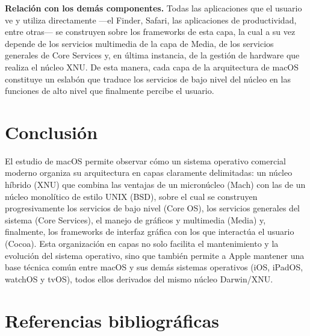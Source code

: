 \documentclass[12pt,letterpaper]{article}
\begin{document}
\textbf{Relación con los demás componentes.} Todas las aplicaciones que el usuario ve y utiliza directamente —el Finder, Safari, las aplicaciones de productividad, entre otras— se construyen sobre los frameworks de esta capa, la cual a su vez depende de los servicios multimedia de la capa de Media, de los servicios generales de Core Services y, en última instancia, de la gestión de hardware que realiza el núcleo XNU. De esta manera, cada capa de la arquitectura de macOS constituye un eslabón que traduce los servicios de bajo nivel del núcleo en las funciones de alto nivel que finalmente percibe el usuario.

\section{Conclusión}

El estudio de macOS permite observar cómo un sistema operativo comercial moderno organiza su arquitectura en capas claramente delimitadas: un núcleo híbrido (XNU) que combina las ventajas de un micronúcleo (Mach) con las de un núcleo monolítico de estilo UNIX (BSD), sobre el cual se construyen progresivamente los servicios de bajo nivel (Core OS), los servicios generales del sistema (Core Services), el manejo de gráficos y multimedia (Media) y, finalmente, los frameworks de interfaz gráfica con los que interactúa el usuario (Cocoa). Esta organización en capas no solo facilita el mantenimiento y la evolución del sistema operativo, sino que también permite a Apple mantener una base técnica común entre macOS y sus demás sistemas operativos (iOS, iPadOS, watchOS y tvOS), todos ellos derivados del mismo núcleo Darwin/XNU.

\newpage
\section*{Referencias bibliográficas}
\end{document}

